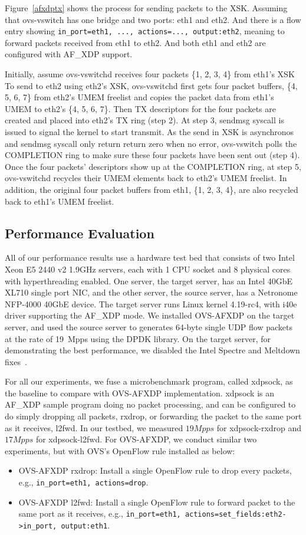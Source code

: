 \documentclass[10pt]{sigplanconf}
\begin{document}
Figure~\ref{afxdptx} shows the process for sending packets to the XSK.
Assuming that ovs-vswitch has one bridge and two ports: eth1 and eth2.
And there is a flow entry showing
\texttt{in\_port=eth1, ..., actions=..., output:eth2}, meaning to forward
packets received from eth1 to eth2.
And both eth1 and eth2 are configured with AF\_XDP support.

Initially, assume ovs-vswitchd receives four packets \{1, 2, 3, 4\} from eth1's XSK
To send to eth2 using eth2's XSK, ovs-vswitchd first gets four packet buffers,
\{4, 5, 6, 7\} from eth2's UMEM freelist and copies the packet data from eth1's UMEM
to eth2's \{4, 5, 6, 7\}.  Then TX descriptors for the four packets are
created and placed into eth2's TX ring (step 2).
At step 3, sendmsg syscall is issued to signal the kernel to start transmit.
As the send in XSK is asynchronos and sendmsg syscall only return return zero when
no error, ovs-vswitch polls the COMPLETION ring to make sure these four
packets have been sent out (step 4).
Once the four packets' descriptors show up at the COMPLETION ring, at step 5,
ovs-vswitchd recycles their UMEM elements back to eth2's UMEM freelist.
In addition, the original four packet buffers from eth1, \{1, 2, 3, 4\}, are
also recycled back to eth1's UMEM freelist.

\subsection{Performance Evaluation}
All of our performance results use a hardware test bed that consists of
two Intel Xeon E5 2440 v2 1.9GHz servers, each with 1 CPU socket and
8 physical cores with hyperthreading enabled.
One server, the target server, has an Intel 40GbE XL710 single port NIC,
and the other server, the source server, has a Netronome NFP-4000 40GbE device.
The target server runs Linux kernel 4.19-rc4, with i40e driver supporting
the AF\_XDP mode.
We installed OVS-AFXDP on the target server, and used the source server to
generates 64-byte single UDP flow packets
at the rate of 19~Mpps using the DPDK library.
On the target server, for demonstrating the best performance,
we disabled the Intel Spectre and Meltdown fixes~\cite{jesper_xdp_perf_drop, retpoline}.

For all our experiments, we fuse a microbenchmark program, called xdpsock,
as the baseline to compare with OVS-AFXDP implementation.
xdpsock is an AF\_XDP sample program doing no packet processing, and can be configured
to do simply dropping all packets, rxdrop, or forwarding the packet to the same port as
it receives, l2fwd.
In our testbed, we measured $19Mpps$ for xdpsock-rxdrop and $17Mpps$ for xdpsock-l2fwd.
For OVS-AFXDP, we conduct similar two experiments, but with OVS's OpenFlow rule installed as
below:
\begin{itemize}
\item OVS-AFXDP rxdrop: Install a single OpenFlow rule to drop every packets,
e.g.,  \texttt{in\_port=eth1, actions=drop}.
\item OVS-AFXDP l2fwd: Install a single OpenFlow rule to forward packet to the same port
as it receives, e.g., \texttt{in\_port=eth1, actions=set\_fields:eth2->in\_port, output:eth1}.
\end{itemize}
\end{document}
